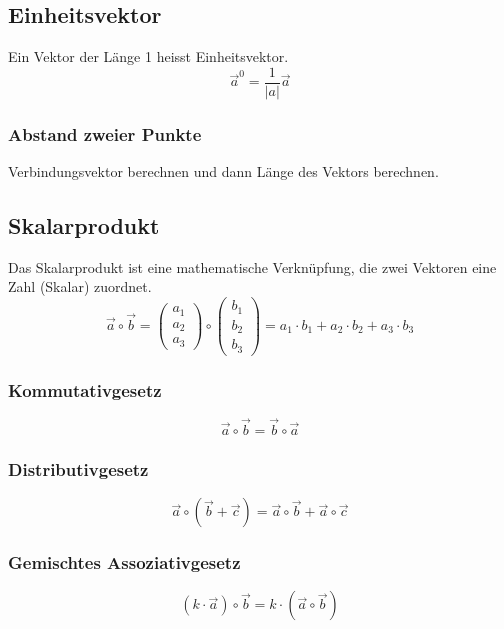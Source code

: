 \begin{multicols}{3}
\subsection*{Einheitsvektor}
Ein Vektor der Länge 1 heisst Einheitsvektor.
\begin{equation*}
    \vec{a}^0 = \frac{1}{|a|} \vec{a}
\end{equation*}
\subsubsection*{Abstand zweier Punkte}
Verbindungsvektor berechnen und dann Länge des Vektors berechnen.
\subsection*{Skalarprodukt}
Das Skalarprodukt ist eine mathematische Verknüpfung, die zwei Vektoren eine Zahl (Skalar) zuordnet.
\begin{equation*}
    \vec{a} \circ \vec{b} = \begin{pmatrix} a_1 \\ a_2 \\ a_3 \end{pmatrix} \circ \begin{pmatrix} b_1 \\ b_2 \\ b_3 \end{pmatrix} = a_1 \cdot b_1 + a_2 \cdot b_2 + a_3 \cdot b_3
\end{equation*}
\subsubsection*{Kommutativgesetz}
\begin{equation*}
    \vec{a} \circ \vec{b} = \vec{b} \circ \vec{a}
\end{equation*}
\subsubsection*{Distributivgesetz}
\begin{equation*}
    \vec{a} \circ \left(\vec{b} + \vec{c}\right) = \vec{a} \circ \vec{b} + \vec{a} \circ \vec{c}
\end{equation*}
\subsubsection*{Gemischtes
Assoziativgesetz}
\begin{equation*}
    \left(k \cdot \vec{a}\right) \circ \vec{b} = k \cdot \left(\vec{a} \circ \vec{b}\right)
\end{equation*}

\end{multicols}
